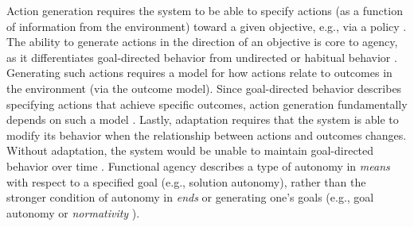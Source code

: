 \documentclass{article}
\theoremstyle{plain}
\theoremstyle{definition}
\theoremstyle{remark}
\begin{document}
Action generation requires the system to be able to specify actions (as a function of information from the environment) toward a given objective, e.g., via a policy \cite{bellman1957dynamic,sutton1998reinforcement}. 
The ability to generate actions in the direction of an objective is core to agency, as it differentiates goal-directed behavior from undirected or habitual behavior \cite{balleine1998goal,gollwitzer1999implementation,bandura2001social,davidson2001essays,dolan2013goals,xu2024towards}. 
Generating such actions requires a model for how actions relate to outcomes in the environment (via the outcome model). Since goal-directed behavior describes specifying actions that achieve specific outcomes, action generation fundamentally depends on such a model \cite{bratman1987intention,von2004explanation,schlosser2019agency,niu2023influence,da2024active,richens2024robust}. Lastly, adaptation requires that the system is able to modify its behavior when the relationship between actions and outcomes changes. Without adaptation, the system would be unable to maintain goal-directed behavior over time \cite{varela1984living,di2005autopoiesis,thompson2011living}. Functional agency describes a type of autonomy in \emph{means} with respect to a specified goal (e.g., solution autonomy), rather than the stronger condition of autonomy in \emph{ends} or generating one's goals (e.g., goal autonomy or \emph{normativity} \cite{barandiaran2009defining,barandiaran2024transforming}). 
\end{document}
